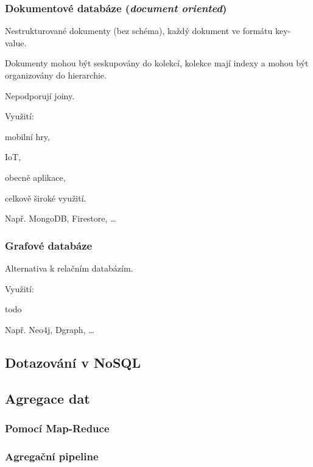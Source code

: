 \subsubsection*{Dokumentové databáze (\textit{document oriented})}

\begin{compactitem}
    \item Nestrukturované dokumenty (bez schéma), každý dokument ve formátu key-value.
    \item Dokumenty mohou být seskupovány do kolekcí, kolekce mají indexy a mohou být organizovány do hierarchie.
    \item Nepodporují joiny.
    \item Využití: \begin{compactitem}
        \item mobilní hry,
        \item IoT,
        \item obecně aplikace,
        \item celkově široké využití.
    \end{compactitem}
    \item Např. MongoDB, Firestore, \dots
\end{compactitem}


\subsubsection*{Grafové databáze}

\begin{compactitem}
    \item Alternativa k relačním databázím.
    \item Využití: \begin{compactitem}
        \item todo
    \end{compactitem}
    \item Např. Neo4j, Dgraph, \dots
\end{compactitem}

\subsection{Dotazování v NoSQL}


\subsection{Agregace dat}


\subsubsection*{Pomocí Map-Reduce}


\subsubsection*{Agregační pipeline}


